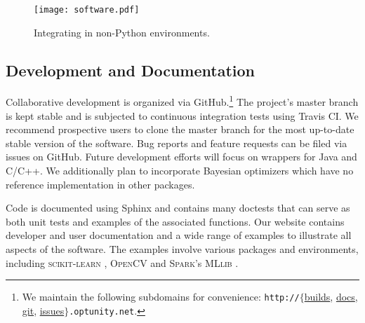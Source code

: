 \begin{figure}[!h]
  \centering 
      \texttt{[image: software.pdf]} 
  \caption{Integrating \optunity in non-Python environments.}\label{fig:workflow}
\end{figure}

\subsection{Development and Documentation}
Collaborative development is organized via GitHub.\footnote{We maintain the following subdomains for convenience: \texttt{http://}$\{$\href{http://builds.optunity.net}{builds}, \href{http://docs.optunity.net}{docs}, \href{http://git.optunity.net}{git}, \href{http://issues.optunity.net}{issues}$\}$\texttt{.optunity.net}.} The project's master branch is kept stable and is subjected to continuous integration tests using Travis CI. 
We recommend prospective users to clone the master branch for the most up-to-date stable version of the software. Bug reports and feature requests can be filed via issues on GitHub. Future development efforts will focus on wrappers for Java and C/C++. We additionally plan to incorporate Bayesian optimizers which have no reference implementation in other packages. %

Code is documented using Sphinx and contains many doctests that can serve as both unit tests and examples of the associated functions. 
Our website contains developer and user documentation and a wide range of examples to illustrate all aspects of the software. 
The examples involve various packages and environments, including \textsc{scikit-learn} \citep{pedregosa2011scikit}, \textsc{OpenCV} \citep{opencv_library} and \textsc{Spark}'s \textsc{MLlib} \citep{zaharia2010spark}.


